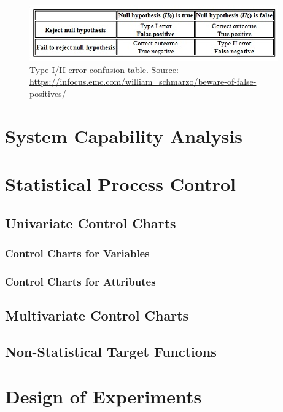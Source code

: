 \documentclass[12pt,a4paper]{report}
\begin{document}
\begin{figure}
\centering
\includegraphics[width=0.8\linewidth]{art/Beware-of-False-Positives-Chart-1}
\caption[Confusion Table]{Type I/II error confusion table. Source: \url{https://infocus.emc.com/william_schmarzo/beware-of-false-positives/}}
\label{fig:confusion_table}
\end{figure}




\chapter{System Capability Analysis}




\chapter{Statistical Process Control}
\section{Univariate Control Charts}
\subsection{Control Charts for Variables}
\subsection{Control Charts for Attributes}



\section{Multivariate Control Charts}


\section{Non-Statistical Target Functions}



\chapter{Design of Experiments}
\end{document}

